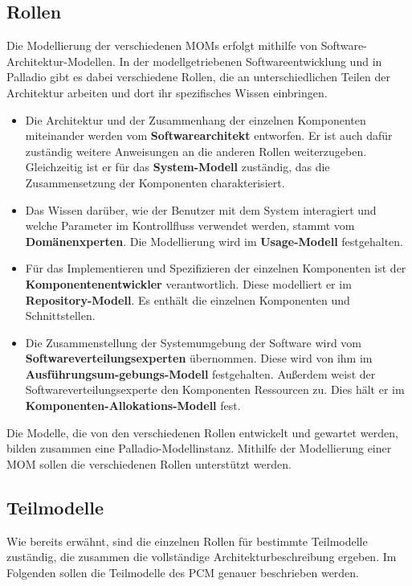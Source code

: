 \subsection{Rollen}
Die Modellierung der verschiedenen MOMs erfolgt mithilfe von Software-Architektur-Modellen. In der modellgetriebenen Softwareentwicklung und in Palladio gibt es dabei verschiedene Rollen, die an unterschiedlichen Teilen der Architektur arbeiten und dort ihr spezifisches Wissen einbringen.
\begin{itemize}
\item Die Architektur und der Zusammenhang der einzelnen Komponenten
miteinander werden vom \textbf{Softwarearchitekt} entworfen. Er ist auch dafür
zuständig weitere Anweisungen an die anderen Rollen weiterzugeben. Gleichzeitig ist er für das \textbf{System-Modell} zuständig, das die Zusammensetzung der Komponenten charakterisiert.
\item Das Wissen darüber, wie der Benutzer mit dem System interagiert
und welche Parameter im Kontrollfluss verwendet werden, stammt vom \textbf{Domänenxperten}. Die Modellierung wird im \textbf{Usage-Modell} festgehalten.
\item Für das Implementieren und Spezifizieren der einzelnen
Komponenten ist der \textbf{Komponentenentwickler} verantwortlich. Diese modelliert er im \textbf{Repository-Modell}. Es enthält die einzelnen Komponenten und Schnittstellen.
\item Die Zusammenstellung der Systemumgebung der Software wird vom \textbf{Softwareverteilungsexperten} übernommen. Diese wird von ihm im \textbf{Ausführungsum-gebungs-Modell} festgehalten. Außerdem weist der Softwareverteilungsexperte den Komponenten Ressourcen zu. Dies hält er im \textbf{Komponenten-Allokations-Modell} fest.
\end{itemize}
Die Modelle, die von den verschiedenen Rollen entwickelt und gewartet werden, bilden zusammen eine Palladio-Modellinstanz. Mithilfe der Modellierung einer MOM sollen die verschiedenen Rollen unterstützt werden. 

\subsection{Teilmodelle}
Wie bereits erwähnt, sind die einzelnen Rollen für bestimmte Teilmodelle zuständig, die zusammen die vollständige Architekturbeschreibung ergeben. Im Folgenden sollen die Teilmodelle des PCM genauer beschrieben werden.

